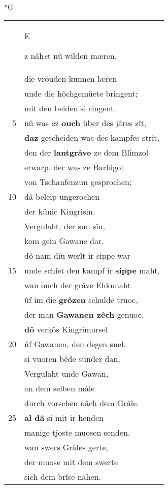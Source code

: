 \documentclass[8pt,a4paper,notitlepage]{article}
\begin{document}
\newpage
\begin{table}[ht]
\begin{minipage}[t]{0.5\linewidth}
\small
\begin{center}*G
\end{center}
\begin{tabular}{rl}
 & \begin{large}E\end{large}z nâh\textit{e}t nû wilden mæren,\\ 
 & die vröuden kunnen læren\\ 
 & unde die hôchgemüete bringent;\\ 
 & mit den beiden si ringent.\\ 
5 & nû was ez \textbf{ouch} über des jâres zît,\\ 
 & \textbf{daz} gescheiden was des kampfes strît,\\ 
 & den der \textbf{lantgrâve} ze dem Blimzol\\ 
 & erwarp. der was ze Barbigol\\ 
 & von Tschanfenzun gesprochen;\\ 
10 & dâ beleip ungerochen\\ 
 & der künic Kingrisin.\\ 
 & Vergulaht, der sun sîn,\\ 
 & kom gein Gawane dar.\\ 
 & dô nam diu werlt ir sippe war\\ 
15 & unde schiet den kampf ir \textbf{sippe} maht,\\ 
 & wan ouch der grâve Ehkunaht\\ 
 & ûf im die \textbf{grôzen} schulde truoc,\\ 
 & der man \textbf{Gawanen zêch} genuoc.\\ 
 & \textbf{dô} verkôs Kingrimursel\\ 
20 & ûf Gawanen, den degen snel.\\ 
 & si vuoren bêde sunder dan,\\ 
 & Vergulaht unde Gawan,\\ 
 & an dem selben mâle\\ 
 & durch vorschen nâch dem Grâle.\\ 
25 & \textbf{al dâ} si mit ir henden\\ 
 & manige tjoste muosen senden.\\ 
 & wan swers Grâles gerte,\\ 
 & der muose mit dem swerte\\ 
 & sich dem brîse nâhen.\\ 

\end{tabular}
\end{minipage}
\end{table}
\end{document}
